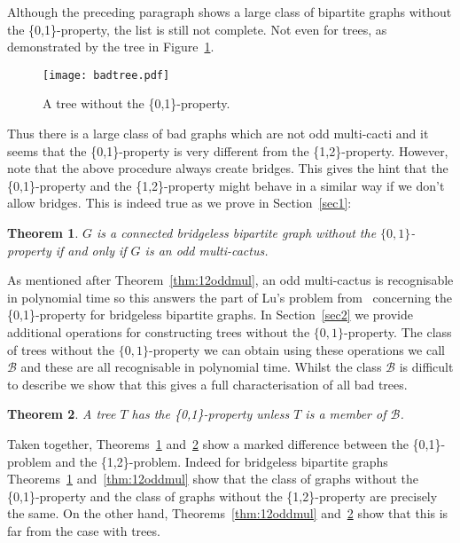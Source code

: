 \documentclass[
final,
 nomarks,
]{dmtcs-episciences}
\newtheorem{theorem}{Theorem}[]
\theoremstyle{definition}
\begin{document}
\noindent Although the preceding paragraph shows a large class of bipartite graphs without the \{0,1\}-property, the list is still not complete. Not even for trees, as demonstrated by the tree in Figure~\ref{fig:smallbadtree}.
\begin{figure}[H] 
\centering 
\texttt{[image: badtree.pdf]} 
\caption{A tree without the \{0,1\}-property.}
\label{fig:smallbadtree}
\end{figure} 
\noindent Thus there is a large class of bad graphs which are not odd multi-cacti and it seems that the \{0,1\}-property is very different from the \{1,2\}-property. However, note that the above procedure always create bridges. This gives the hint that the \{0,1\}-property and the \{1,2\}-property might behave in a similar way if we don't allow bridges. This is indeed true as we prove in Section~\ref{sec1}: 
\begin{theorem} \label{Thm:1}
$G$ is a connected bridgeless bipartite graph without the $\{0,1\}$-property if and only if $G$ is an odd multi-cactus.
\end{theorem}
\noindent As mentioned after Theorem~\ref{thm:12oddmul}, an odd multi-cactus is recognisable in polynomial time so this answers the part of Lu's problem from~\cite{Lu} concerning the \{0,1\}-property for bridgeless bipartite graphs. In Section~\ref{sec2} we provide additional operations for constructing trees without the $\{0,1\}$-property. The class of trees without the $\{0,1\}$-property we can obtain using these operations we call $\mathcal{B}$ and these are all recognisable in polynomial time. Whilst the class $\mathcal{B}$ is difficult to describe we show that this gives a full characterisation of all bad trees.
\begin{theorem} \label{Thm:2}
A tree $T$ has the \{0,1\}-property unless $T$ is a member of $\mathcal{B}$.
\end{theorem}
\noindent Taken together, Theorems~\ref{Thm:1} and~\ref{Thm:2} show a marked difference between the \{0,1\}-problem and the \{1,2\}-problem. Indeed for bridgeless bipartite graphs Theorems~\ref{Thm:1} and~\ref{thm:12oddmul} show that the class of graphs without the \{0,1\}-property and the class of graphs without the \{1,2\}-property are precisely the same. On the other hand, Theorems~\ref{thm:12oddmul} and~\ref{Thm:2}  show that this is far from the case with trees.
\end{document}
